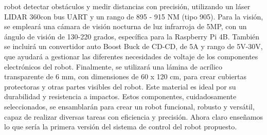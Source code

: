         robot detectar obst\'aculos y medir distancias con precisi\'on, utilizando un l\'aser LIDAR 360\degree con bus UART 
        y un rango de 895 - 915 NM (tipo 905).
    \vskip 0.5cm
    Para la visi\'on, se emplear\'a una c\'amara de visi\'on nocturna de luz infrarroja de 5MP, con un \'angulo de visi\'on de 
        130-220 grados, espec\'ifica para la Raspberry Pi 4B. Tambi\'en se incluir\'a un convertidor auto Boost Buck de CD-CD, 
        de 5A y rango de 5V-30V, que ayudar\'a a gestionar las diferentes necesidades de voltaje de los componentes 
        electr\'onicos del robot.
    \vskip 0.5cm
    Finalmente, se utilizar\'a una l\'amina de acr\'ilico transparente de 6 mm, con dimensiones de 60 x 120 cm, 
        para crear cubiertas protectoras y otras partes visibles del robot. Este material es ideal por su 
        durabilidad y resistencia a impactos.
    \vskip 0.5cm
    Estos componentes, cuidadosamente seleccionados, se ensamblar\'an para crear un robot funcional, 
        robusto y vers\'atil, capaz de realizar diversas tareas con eficiencia y precisi\'on.
    \vskip 0.5cm
    Ahora claro ense\~namos lo que ser\'ia la primera versi\'on del sistema de control del robot propuesto.
    
    
    
    
    
    
